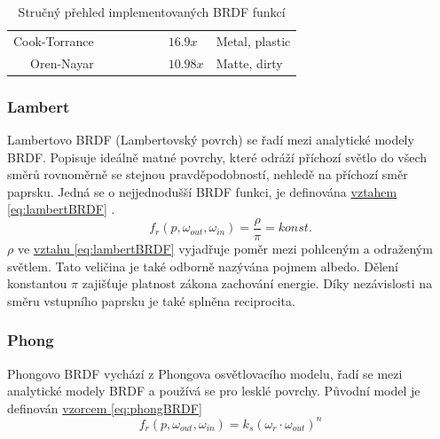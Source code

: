 \documentclass[czech,master,dept460,male,cpp,cpdeclaration]{diploma}
\newcommand{\alb}{\rho}
\newcommand{\refl}{\omega_{r}}
\newcommand{\true}{\ding{51}}
\newcommand{\false}{\ding{55}}
\begin{document}
\begin{table}[ht]
\begin{tabular}{r|lllllll}
        Cook-Torrance       & \true                    & \true                     & \true                       & \false                      & \false                   & \(16.9x\)                          & Metal, plastic                \\
        Oren-Nayar          & \true                    & \true                     & \false                      & \false                      & \true                    & \(10.98x\)                         & Matte, dirty                  \\
        \hline
    \end{tabular}
    \caption{Stručný přehled implementovaných BRDF funkcí}
    \label{tab:brdfProperties}
\end{table}

\subsubsection{Lambert} \label{sec:Lambert}
Lambertovo BRDF (Lambertovský povrch) se řadí mezi analytické modely BRDF. Popisuje ideálně matné povrchy, které odráží příchozí světlo do všech směrů rovnoměrně se stejnou pravděpodobností, nehledě na příchozí směr paprsku. Jedná se o nejjednodušší BRDF funkci, je definována \hyperref[eq:lambertBRDF]{vztahem \ref{eq:lambertBRDF}} \cite{Koppal2014}.
\begin{equation} \label{eq:lambertBRDF}
    f_r\left(p,\omega_{out},\omega_{in}\right) = \frac{\alb}{\pi} = konst.
\end{equation}
\(\alb\) ve \hyperref[eq:lambertBRDF]{vztahu \ref{eq:lambertBRDF}} vyjadřuje poměr mezi pohlceným a odraženým světlem. Tato veličina je také odborně nazývána pojmem albedo. Dělení konstantou \(\pi\) zajišťuje platnost zákona zachování energie. Díky nezávislosti na směru vstupního paprsku je také splněna reciprocita.

\subsubsection{Phong} \label{sec:Phong}
Phongovo BRDF vychází z Phongova osvětlovacího modelu, řadí se mezi analytické modely BRDF a používá se pro lesklé povrchy. Původní model je definován \hyperref[eq:phongBRDF]{vzorcem \ref{eq:phongBRDF}} \cite{Phong1975}
\begin{equation} \label{eq:phongBRDF}
    f_r\left(p,\omega_{out},\omega_{in}\right) = k_s(\refl\cdot\omega_{out})^n
\end{equation}
\end{document}
